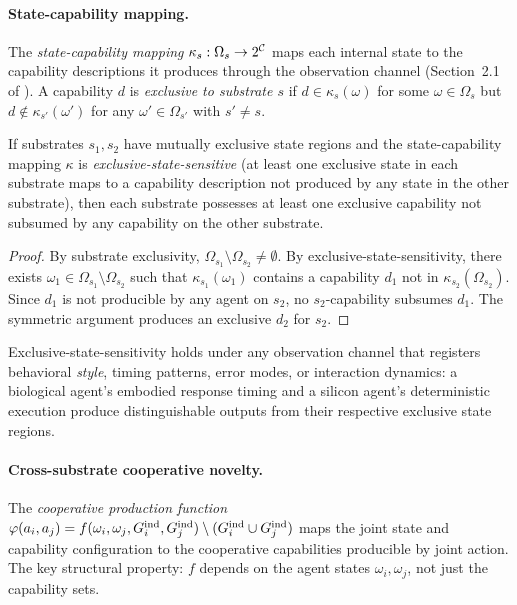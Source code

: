 \paragraph{State-capability mapping.} The \emph{state-capability mapping}
$\kappa_s : \Omega_s \to 2^{\mathcal{C}}$ maps each internal state to the capability
descriptions it produces through the observation channel (Section~2.1 of
\citet{lasser2026poset}). A capability $d$ is \emph{exclusive to substrate
$s$} if $d \in \kappa_s(\omega)$ for some $\omega \in \Omega_s$ but
$d \notin \kappa_{s'}(\omega')$ for any $\omega' \in \Omega_{s'}$ with
$s' \neq s$.

\begin{proposition}
\label{prop:segmentation}
If substrates $s_1, s_2$ have mutually exclusive state regions and the
    state-capability mapping $\kappa$ is \emph{exclusive-state-sensitive}
    (at least one exclusive state in each substrate maps to a capability
    description not produced by any state in the other substrate), then
    each substrate possesses at least one exclusive capability not subsumed
    by any capability on the other substrate.
\end{proposition}

\begin{proof}
By substrate exclusivity, $\Omega_{s_1} \setminus \Omega_{s_2} \neq
\emptyset$. By exclusive-state-sensitivity, there exists $\omega_1 \in
\Omega_{s_1} \setminus \Omega_{s_2}$ such that $\kappa_{s_1}(\omega_1)$
contains a capability $d_1$ not in $\kappa_{s_2}(\Omega_{s_2})$. Since
$d_1$ is not producible by any agent on $s_2$, no $s_2$-capability
subsumes $d_1$. The symmetric argument produces an exclusive $d_2$ for
$s_2$.
\end{proof}

Exclusive-state-sensitivity holds under any observation channel that
registers behavioral \emph{style}, timing patterns, error modes, or
interaction dynamics: a biological agent's embodied response timing and a
silicon agent's deterministic execution produce distinguishable outputs from
their respective exclusive state regions.

\paragraph{Cross-substrate cooperative novelty.} The \emph{cooperative
production function} $\varphi(a_i, a_j) = f(\omega_i, \omega_j,
G_{i}^{\mathrm{ind}}, G_{j}^{\mathrm{ind}}) \setminus (G_{i}^{\mathrm{ind}} \cup G_{j}^{\mathrm{ind}})$ maps the joint
state and capability configuration to the cooperative capabilities
producible by joint action. The key structural property: $f$ depends on the
agent states $\omega_i, \omega_j$, not just the capability sets.

